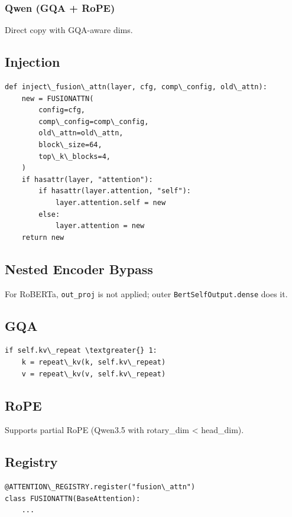 \subsubsection{Qwen (GQA + RoPE)}
Direct copy with GQA-aware dims.

\subsection{Injection}

\begin{lstlisting}
def inject\_fusion\_attn(layer, cfg, comp\_config, old\_attn):
    new = FUSIONATTN(
        config=cfg,
        comp\_config=comp\_config,
        old\_attn=old\_attn,
        block\_size=64,
        top\_k\_blocks=4,
    )
    if hasattr(layer, "attention"):
        if hasattr(layer.attention, "self"):
            layer.attention.self = new
        else:
            layer.attention = new
    return new
\end{lstlisting}

\subsection{Nested Encoder Bypass}

For RoBERTa, \texttt{out\_proj} is not applied; outer \texttt{BertSelfOutput.dense} does it.

\subsection{GQA}

\begin{lstlisting}
if self.kv\_repeat \textgreater{} 1:
    k = repeat\_kv(k, self.kv\_repeat)
    v = repeat\_kv(v, self.kv\_repeat)
\end{lstlisting}

\subsection{RoPE}

Supports partial RoPE (Qwen3.5 with rotary\_dim \textless{} head\_dim).

\subsection{Registry}

\begin{lstlisting}
@ATTENTION\_REGISTRY.register("fusion\_attn")
class FUSIONATTN(BaseAttention):
    ...
\end{lstlisting}

